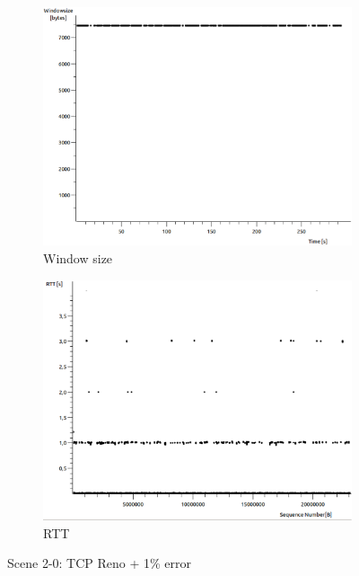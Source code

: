 \documentclass[conference,a4paper]{IEEEtran}
\begin{document}
\begin{figure}
\begin{subfigure}[b]{0.2\textwidth}
  \includegraphics[width=\textwidth]{s2-0_wnd}
  \caption{Window size}
 \end{subfigure}
 \begin{subfigure}[b]{0.2\textwidth}
  \includegraphics[width=\textwidth]{s2-0_rtt}
  \caption{RTT}
 \end{subfigure}
 \caption{Scene 2-0: TCP Reno + 1\% error}
\end{figure}
\end{document}
